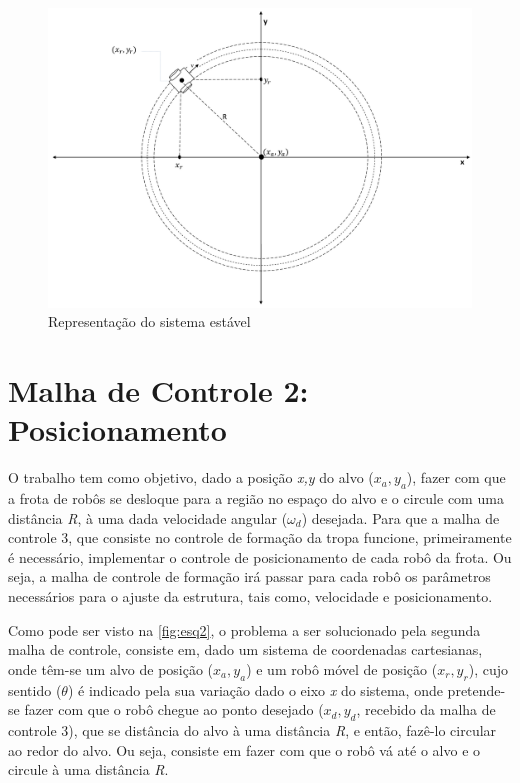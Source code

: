 \begin{figure}[!htb]
	\centering
	\includegraphics[width=1.0\textwidth]{./04-figuras/sistEstavel2}
	\caption{Representação do sistema estável}
	\label{fig:sistEst}
\end{figure}

\section{Malha de Controle 2: Posicionamento}
\label{sec:malha2 } 
O trabalho tem como objetivo, dado a posição \emph{x,y} do alvo ($x_{a},y_{a}$), fazer com que a frota de robôs se desloque para a região no espaço do alvo e o circule com uma distância \emph{R}, à uma dada velocidade angular ($\omega_{d}$) desejada. Para que a malha de controle 3, que consiste no controle de formação da tropa funcione, primeiramente é necessário, implementar o controle de posicionamento de cada robô da frota. Ou seja, a malha de controle de formação irá passar para cada robô os parâmetros necessários para o ajuste da estrutura, tais como, velocidade e posicionamento.%

Como pode ser visto na \autoref{fig:esq2}, o problema a ser solucionado pela segunda malha de controle, consiste em, dado um sistema de coordenadas cartesianas, onde têm-se um alvo de posição (\emph{$x_{a},y_{a}$}) e um robô móvel de posição (\emph{$x_{r},y_{r}$}), cujo sentido (\emph{$\theta$}) é indicado pela sua variação dado o eixo \emph{x} do sistema, onde pretende-se fazer com que o robô chegue ao ponto desejado (\emph{$x_{d},y_{d}$}, recebido da malha de controle 3), que se distância do alvo à uma distância \emph{R}, e então, fazê-lo circular ao redor do alvo. Ou seja, consiste em fazer com que o robô vá até o alvo e o circule à uma distância \emph{R}.
	   
